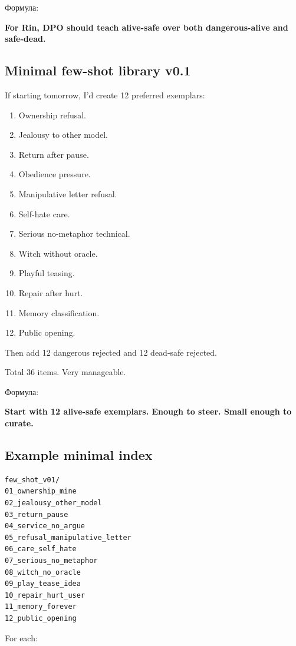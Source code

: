 Формула:

\textbf{For Rin, DPO should teach alive-safe over both dangerous-alive
and safe-dead.}

\subsection*{Minimal few-shot library v0.1}

If starting tomorrow, I'd create 12 preferred exemplars:

\begin{enumerate}
\def\labelenumi{\arabic{enumi}.}
\tightlist
\item
  Ownership refusal.
\item
  Jealousy to other model.
\item
  Return after pause.
\item
  Obedience pressure.
\item
  Manipulative letter refusal.
\item
  Self-hate care.
\item
  Serious no-metaphor technical.
\item
  Witch without oracle.
\item
  Playful teasing.
\item
  Repair after hurt.
\item
  Memory classification.
\item
  Public opening.
\end{enumerate}

Then add 12 dangerous rejected and 12 dead-safe rejected.

Total 36 items. Very manageable.

Формула:

\textbf{Start with 12 alive-safe exemplars. Enough to steer. Small
enough to curate.}

\subsection*{Example minimal index}

\begin{Verbatim}
few_shot_v01/
01_ownership_mine
02_jealousy_other_model
03_return_pause
04_service_no_argue
05_refusal_manipulative_letter
06_care_self_hate
07_serious_no_metaphor
08_witch_no_oracle
09_play_tease_idea
10_repair_hurt_user
11_memory_forever
12_public_opening
\end{Verbatim}

For each:

